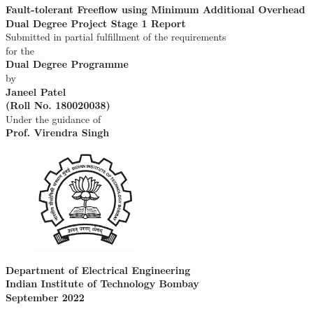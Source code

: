 \documentclass[a4paper,12pt, final]{report}
\begin{document}
  \thispagestyle{empty}
  \vspace*{1cm}
  {\centering     
  \textbf{\LARGE Fault-tolerant Freeflow using Minimum Additional Overhead}\\
  \vspace{1.20cm}
  \textbf{\large Dual Degree Project Stage 1 Report}\\
  \vspace{1cm}
  {Submitted in partial fulfillment of the requirements}\\
  \vspace{0.25cm}
  {for the}\\
  \vspace{1cm}
  \textbf{ Dual Degree Programme}\\
  \vspace{1.50cm}
  {by}\\
  \vspace{0.20cm}
  \textbf{\large Janeel Patel}\\
  \vspace{0.25cm}
  \textbf{\large (Roll No. 180020038)}\\
  \vspace{1.8cm}
  {Under the guidance of}\\
  \vspace{0.20cm}
  \textbf{\large Prof. Virendra Singh}\\
    \vspace{0.30cm}
  \vspace{1.450cm}
    \begin{figure}[htb]
    \begin{center}
    \includegraphics[height=1.5in,width=1.5in]{august22/img/iitblogo.png}
    \end{center}
    \end{figure}

    
  {\textbf{Department of Electrical Engineering}}\\
  {\textbf{Indian Institute of Technology Bombay}}\\
  {\textbf{September 2022}}
 
 }
 
\end{document}
